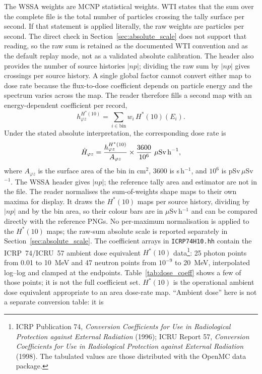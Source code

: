 \documentclass[11pt,a4paper]{article}
\begin{document}
The WSSA weights are MCNP statistical weights.  WTI states that the sum over
the complete file is the total number of particles crossing the tally surface
per second.  If that statement is applied literally, the raw weights are
particles per second.  The direct check in Section~\ref{sec:absolute_scale}
does not support that reading, so the raw sum is retained as the documented
WTI convention and as the default replay mode, not as a validated absolute
calibration.  The header also provides the number of source histories $|np|$;
dividing the raw sum by $|np|$ gives crossings per source history.  A single
global factor cannot convert either map to dose rate because the flux-to-dose
coefficient depends on particle energy and the spectrum varies across the map.  The reader therefore fills a second map with an
energy-dependent coefficient per record,
\[
  h^{H^*(10)}_{\varphi z}
  = \sum_{i\in\text{bin}} w_i\,H^*(10)(E_i).
\]
Under the stated absolute interpretation, the corresponding dose rate is
\[
  \dot H_{\varphi z}
  = \frac{h^{H^*(10)}_{\varphi z}}{A_{\varphi z}}
    \times \frac{3600}{10^{6}}~\mu\text{Sv\,h}^{-1},
\]
where \(A_{\varphi z}\) is the surface area of the bin in cm\(^2\), 3600 is
s\,h\(^{-1}\), and \(10^{6}\) is pSv\,$\mu$Sv\(^{-1}\).  The WSSA header
gives \(|np|\); the reference tally area and estimator are not in the file.
The reader normalises the sum-of-weights shape maps to their own maxima for
display.  It draws the $H^*(10)$ maps per source history, dividing by $|np|$
and by the bin area, so their colour bars are in $\mu$Sv\,h$^{-1}$ and can be
compared directly with the reference PNGs.  No per-maximum normalisation is
applied to the $H^*(10)$ maps; the raw-sum absolute scale is reported separately
in Section~\ref{sec:absolute_scale}.
The coefficient arrays in \texttt{ICRP74H10.hh} contain the ICRP~74/ICRU~57
ambient dose equivalent $H^*(10)$ data\footnote{ICRP Publication 74,
\emph{Conversion Coefficients for Use in Radiological Protection against
External Radiation} (1996); ICRU Report 57, \emph{Conversion Coefficients for
Use in Radiological Protection against External Radiation} (1998).  The
tabulated values are those distributed with the OpenMC data package.}: 25
photon points from 0.01 to 10~MeV and 47 neutron points from $10^{-9}$ to
20~MeV, interpolated log--log and clamped at the endpoints.  Table~\ref{tab:dose_coeff}
shows a few of those points; it is not the full coefficient set.
$H^*(10)$ is the operational ambient dose equivalent appropriate to an area
dose-rate map.  ``Ambient dose'' here is not a separate conversion table: it is
\end{document}
